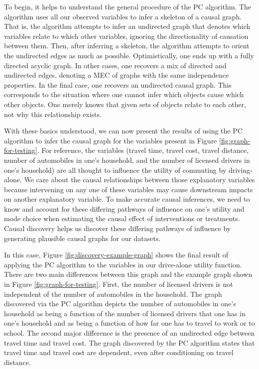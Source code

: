 To begin, it helps to understand the general procedure of the PC algorithm. The algorithm uses all our observed variables to infer a skeleton of a causal graph.
That is, the algorithm attempts to infer an undirected graph that denotes which variables relate to which other variables, ignoring the directionality of causation between them.
Then, after inferring a skeleton, the algorithm attempts to orient the undirected edges as much as possible.
Optimistically, one ends up with a fully directed acyclic graph.
In other cases, one recovers a mix of directed and undirected edges, denoting a MEC of graphs with the same independence properties.
In the final case, one recovers an undirected causal graph.
This corresponds to the situation where one cannot infer which  objects cause which other objects.
One merely knows that given sets of objects relate to each other, not why this relationship exists.

With these basics understood, we can now present the results of using the PC algorithm to infer the causal graph for the variables present in Figure \ref{fig:graph-for-testing}.
For reference, the variables (travel time, travel cost, travel distance, number of automobiles in one's household, and the number of licensed drivers in one's household) are all thought to influence the utility of commuting by driving-alone.
We care about the causal relationships between those explanatory variables because intervening on any one of these variables may cause downstream impacts on another explanatory variable.
To make accurate causal inferences, we need to know and account for these differing pathways of influence on one's utility and mode choice when estimating the causal effect of interventions or treatments.
Causal discovery helps us discover these differing pathways of influence by generating plausible causal graphs for our datasets.


In this case, Figure \ref{fig:discovery-example-graph} shows the final result of applying the PC algorithm to the variables in our drive-alone utility function.
There are two main differences between this graph and the example graph shown in Figure \ref{fig:graph-for-testing}.
First, the number of licensed drivers is not independent of the number of automobiles in the household.
The graph discovered via the PC algorithm depicts the number of automobiles in one's household as being a function of the number of licensed drivers that one has in one's household and as being a function of how far one has to travel to work or to school.
The second major difference is the presence of an undirected edge between travel time and travel cost.
The graph discovered by the PC algorithm states that travel time and travel cost are dependent, even after conditioning on travel distance.

